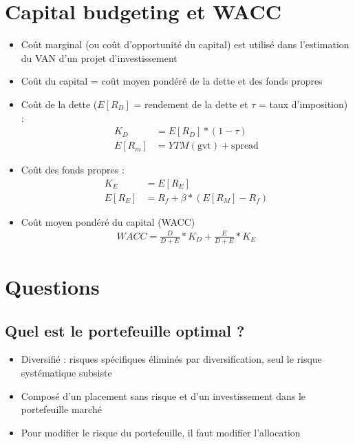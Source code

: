 \section{Capital budgeting et WACC}

\begin{itemize}
    \item Coût marginal (ou coût d'opportunité du capital) est utilisé dans l'estimation du VAN d'un projet d'investissement
    \item Coût du capital = coût moyen pondéré de la dette et des fonds propres
    \item Coût de la dette ($E[R_D]$ = rendement de la dette et $\tau$ = taux d'imposition) :
    \begin{align*}
        K_D &= E[R_D] * (1 - \tau) \\
        E[R_m] &= YTM(\text{gvt}) + \text{spread}
    \end{align*}
    \item Coût des fonds propres :
    \begin{align*}
        K_E &= E[R_E] \\
        E[R_E] &= R_f + \beta * (E[R_M] - R_f)
    \end{align*}
    \item Coût moyen pondéré du capital (WACC)
    \begin{align*}
        WACC = \frac{D}{D + E} * K_D + \frac{E}{D + E} * K_E
    \end{align*}
\end{itemize}

\section{Questions}

\subsection{Quel est le portefeuille optimal ?}

\begin{itemize}
    \item Diversifié : risques spécifiques éliminés par diversification, seul le risque systématique subsiste
    \item Composé d'un placement sans risque et d'un investissement dans le portefeuille marché
    \item Pour modifier le risque du portefeuille, il faut modifier l'allocation
\end{itemize}

